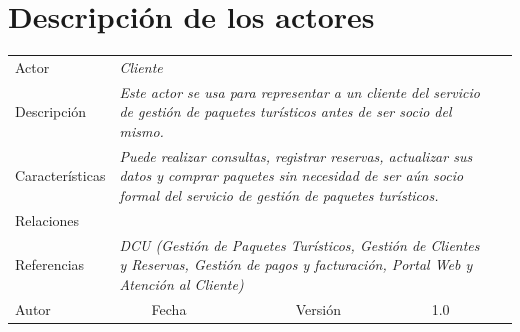 \chapter{Descripción de los actores}

\begin{table}[H]
    \begin{tabular}{llllllll}
    \cline{1-7}
    \multicolumn{1}{|l|}{Actor}           & \multicolumn{4}{l|}{{\color[HTML]{A6A6A6} \textit{Cliente}}}                                                               & \multicolumn{2}{l|}{\cellcolor[HTML]{E6E6E6}{\color[HTML]{A6A6A6} \textit{AC-1}}}                         &  \\ \cline{1-7}
    \multicolumn{1}{|l|}{Descripción}     & \multicolumn{6}{p{12cm}|}{{\color[HTML]{A6A6A6} \textit{Este actor se usa para representar a un cliente del servicio de gestión de paquetes turísticos antes de ser socio del mismo.}}}     &  \\ \cline{1-7}
    \multicolumn{1}{|l|}{Características} & \multicolumn{6}{p{12cm}|}{{\color[HTML]{A6A6A6} \textit{Puede realizar consultas, registrar reservas, actualizar sus datos y comprar paquetes sin necesidad de ser aún socio formal del servicio de gestión de paquetes turísticos.}}} &  \\ \cline{1-7}
    \multicolumn{1}{|l|}{Relaciones}      & \multicolumn{6}{p{12cm}|}{}                                                                                                                                                               &  \\ \cline{1-7}
    \multicolumn{1}{|l|}{Referencias}     & \multicolumn{6}{p{12cm}|}{{\color[HTML]{A6A6A6} \textit{DCU (Gestión de Paquetes Turísticos, Gestión de Clientes y Reservas, Gestión de pagos y facturación, Portal Web y Atención al Cliente)}}}                                                                                                                                                         &  \\ \cline{1-7}
    \multicolumn{1}{|l|}{Autor}           & \multicolumn{1}{l|}{}              & \multicolumn{1}{l|}{Fecha}              & \multicolumn{1}{l|}{}              & \multicolumn{2}{l|}{Versión}                            & \multicolumn{1}{l|}{1.0}                                        &  \\ \cline{1-7}
    \end{tabular}
\end{table}

